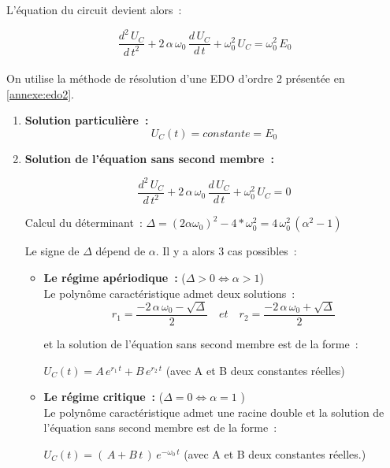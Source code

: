 L'équation du circuit devient alors~:

$$ \dfrac{d^{2}\,U_C}{d\,t^2} + 2\,\alpha\,\omega_0\,\dfrac{d\,U_C}{d\,t} + \omega_0^2\,U_C = \omega_0^2\,E_0 $$\\

On utilise la méthode de résolution d'une EDO d'ordre 2 présentée en \autoref{annexe:edo2}.

\begin{enumerate}

\item \textbf{Solution particulière~:} 
	$$U_C(t) = constante = E_0$$ 

\item \textbf{Solution de l'équation sans second membre~:}

$$ \dfrac{d^{2}\,U_C}{d\,t^2} + 2\,\alpha\,\omega_0\,\dfrac{d\,U_C}{d\,t} + \omega_0^2\,U_C = 0 $$

		Calcul du déterminant~: $\Delta = (2\alpha\omega_0)^2 - 4 * \omega_0^2 = 4\, \omega_0^2\,(\alpha^2 - 1 )$ 

	Le signe de $\Delta $ dépend de $\alpha $. Il y a alors 3 cas possibles~:\\

	\begin{itemize}
		\item \textbf{Le régime apériodique~:} ($\Delta > 0 \Leftrightarrow \alpha > 1 $) \\

			Le polynôme caractéristique admet deux solutions~:
			$$ r_1 = \dfrac{ -2\,\alpha\,\omega_0 - \sqrt{\Delta}}{ 2 } \quad et \quad	r_2 = \dfrac{ -2\,\alpha\,\omega_0 + \sqrt{\Delta}}{ 2 }  $$

			et la solution de l'équation sans second membre est de la forme~:\\
			\begin{center}
				$U_C(t) = A\,e^{r_1\,t} + B\,e^{r_2\,t}$ (avec A et B deux constantes réelles)
			\end{center}
		\bigskip
		\item \textbf{Le régime critique~:} ($\Delta = 0 \Leftrightarrow \alpha = 1$ )\\	

			Le polynôme caractéristique admet une racine double et la solution de l'équation sans second membre est de la forme~:\\

			\begin{center}
				$U_C(t) = (\,A + B\,t\,)\,e^{ -\omega_0\,t} $ (avec A et B deux constantes réelles.) \\
			\end{center}
					

\end{itemize}
\end{enumerate}
